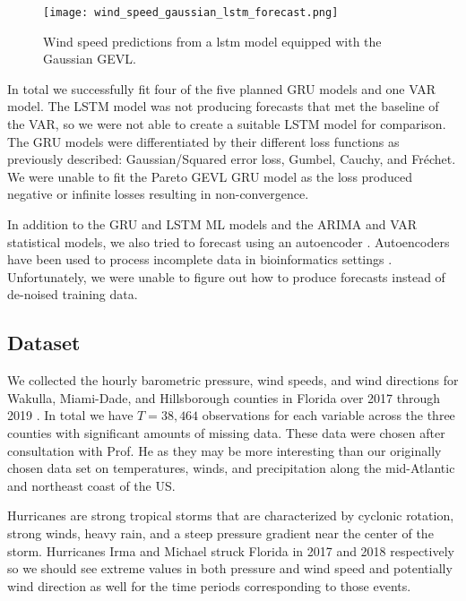 \documentclass[conference]{IEEEtran}
\begin{document}
\begin{figure}
    \centering
    \texttt{[image: wind\_speed\_gaussian\_lstm\_forecast.png]}
    \caption{Wind speed predictions from a lstm model equipped with the Gaussian GEVL.}
    \label{fig:wind-speed-lstm}
\end{figure}

In total we successfully fit four of the five planned GRU models and one VAR model. The LSTM model was not producing forecasts that met the baseline of the VAR, so we were not able to create a suitable LSTM model for comparison. The GRU models were differentiated by their different loss functions as previously described: Gaussian/Squared error loss, Gumbel, Cauchy, and Fr\'echet. We were unable to fit the Pareto GEVL GRU model as the loss produced negative or infinite losses resulting in non-convergence. 

In addition to the GRU and LSTM ML models and the ARIMA and VAR statistical models, we also tried to forecast using an autoencoder \cite{IntroAutoencodersTensorFlow}. Autoencoders have been used to process incomplete data in bioinformatics settings \cite{eraslanSinglecellRNAseqDenoising2019, tianModelbasedAutoencodersImputing2020}. Unfortunately, we were unable to figure out how to produce forecasts instead of de-noised training data. 





\subsection{Dataset}


We collected the hourly barometric pressure, wind speeds, and wind directions for Wakulla, Miami-Dade, and Hillsborough counties in Florida over 2017 through 2019 \cite{DataToolsClimate}. In total we have $T = 38,464$ observations for each variable across the three counties with significant amounts of missing data. These data were chosen after consultation with Prof. He as they may be more interesting than our originally chosen data set on temperatures, winds, and precipitation along the mid-Atlantic and northeast coast of the US.

Hurricanes are strong tropical storms that are characterized by cyclonic rotation, strong winds, heavy rain, and a steep pressure gradient near the center of the storm. Hurricanes Irma and Michael struck Florida in 2017 and 2018 respectively so we should see extreme values in both pressure and wind speed and potentially wind direction as well for the time periods corresponding to those events.
\end{document}
